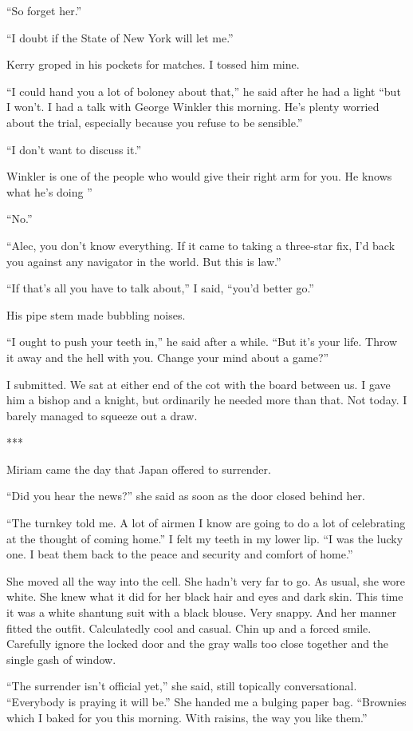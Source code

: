 \documentclass{novel}
\begin{document}
“So forget her.”

“I doubt if the State of New York will let me.”

Kerry groped in his pockets for matches. I tossed him mine.

“I could hand you a lot of boloney about that,” he said after he had a light “but I won’t. I had a talk with George Winkler this morning. He’s plenty worried about the trial, especially because you refuse to be sensible.”

“I don’t want to discuss it.”

Winkler is one of the people who would give their right arm for you. He knows what he’s doing ”

“No.”

“Alec, you don’t know everything. If it came to taking a three-star fix, I’d back you against any navigator in the world. But this is law.”

“If that’s all you have to talk about,” I said, “you’d better go.”

His pipe stem made bubbling noises.

“I ought to push your teeth in,” he said after a while. “But it’s your life. Throw it away and the hell with you. Change your mind about a game?”

I submitted. We sat at either end of the cot with the board between us. I gave him a bishop and a knight, but ordinarily he needed more than that. Not today. I barely managed to squeeze out a draw.

***

Miriam came the day that Japan offered to surrender.

“Did you hear the news?” she said as soon as the door closed behind her.

“The turnkey told me. A lot of airmen I know are going to do a lot of celebrating at the thought of coming home.” I felt my teeth in my lower lip. “I was the lucky one. I beat them back to the peace and security and comfort of home.”

She moved all the way into the cell. She hadn’t very far to go. As usual, she wore white. She knew what it did for her black hair and eyes and dark skin. This time it was a white shantung suit with a black blouse. Very snappy. And her manner fitted the outfit. Calculatedly cool and casual. Chin up and a forced smile. Carefully ignore the locked door and the gray walls too close together and the single gash of window.

“The surrender isn’t official yet,” she said, still topically conversational. “Everybody is praying it will be.” She handed me a bulging paper bag. “Brownies which I baked for you this morning. With raisins, the way you like them.”
\end{document}
